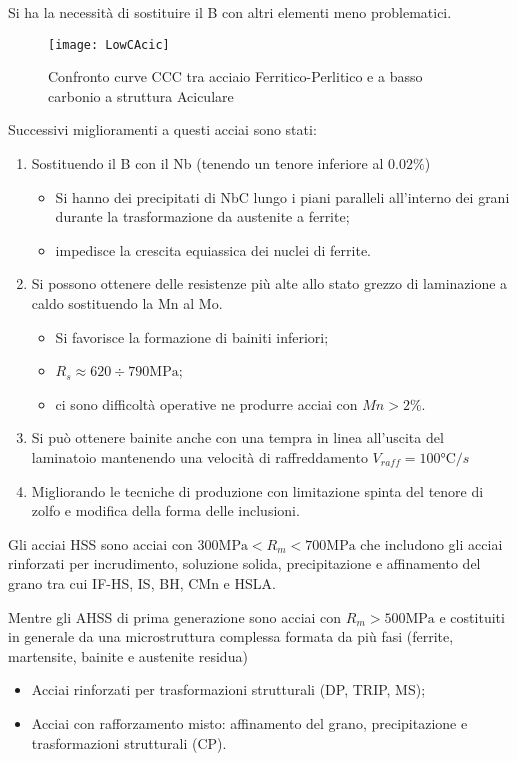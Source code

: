 Si ha la necessità di sostituire il B con altri elementi meno problematici.

\begin{figure}
\centering
\texttt{[image: LowCAcic]}
\caption{Confronto curve CCC tra acciaio Ferritico-Perlitico e a basso carbonio a struttura Aciculare}
\label{fig:ConfFer-Per/LowC}
\end{figure}

Successivi miglioramenti a questi acciai sono stati:
\begin{enumerate}
\item Sostituendo il B con il Nb (tenendo un tenore inferiore al $0.02\%$)
	\begin{itemize}
	\item Si hanno dei precipitati di NbC lungo i piani paralleli all'interno dei grani
	durante la trasformazione da austenite a ferrite;
	\item impedisce la crescita equiassica dei nuclei di ferrite. 
	\end{itemize}
\item Si possono ottenere delle resistenze più alte allo stato grezzo di laminazione a caldo 
sostituendo la Mn al Mo.
	\begin{itemize}
	\item Si favorisce la formazione di bainiti inferiori;
	\item $R_s \approx 620 \div 790\unit{\MPa}$;
	\item ci sono difficoltà operative ne produrre acciai con $Mn > 2\%$.
	\end{itemize}
\item Si può ottenere bainite anche con una tempra in linea all'uscita del laminatoio
mantenendo una velocità di raffreddamento $V_{raff} = 100\unit{\celsius/s}$
\item Migliorando le tecniche di produzione con limitazione spinta del tenore di zolfo e
modifica della forma delle inclusioni.
\end{enumerate}

Gli acciai \ac{HSS} sono acciai con $300\unit{\MPa} < R_m < 700\unit{\MPa}$ che includono gli
acciai rinforzati per incrudimento, soluzione solida, precipitazione e affinamento del grano
tra cui \ac{IF-HS}, \ac{IS}, \ac{BH}, \ac{CMn} e \ac{HSLA}.

Mentre gli \ac{AHSS} di prima generazione sono acciai con $R_m > 500\unit{\MPa}$ e costituiti in 
generale da una microstruttura complessa formata da più fasi (ferrite, martensite, bainite
e austenite residua) 
\begin{itemize}
\item Acciai rinforzati per trasformazioni strutturali (DP, TRIP, MS);
\item Acciai con rafforzamento misto: affinamento del grano, precipitazione e trasformazioni 
strutturali (CP).
\end{itemize}